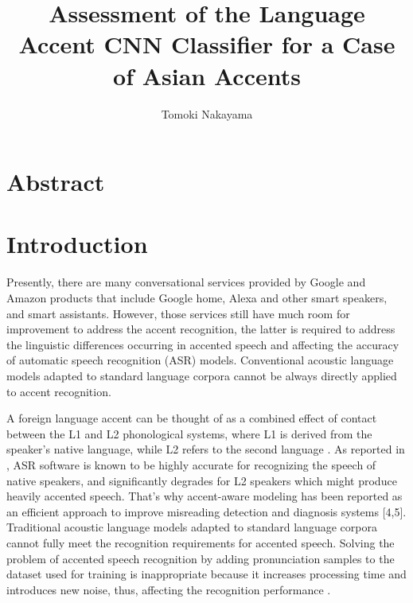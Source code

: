 \documentclass[ams]{U-AizuGT}
\author{Tomoki Nakayama}
\title{Assessment of the Language Accent CNN Classifier for a Case of Asian Accents}
\begin{document}
\maketitle

\section*{Abstract}

\section{Introduction}
Presently, there are many conversational services provided by Google and Amazon products that include Google home, Alexa and other smart speakers, and smart assistants. However, those services still have much room for improvement to address the accent recognition, the latter is required to address the linguistic differences occurring in accented speech and affecting the accuracy of automatic speech recognition (ASR) models.
Conventional acoustic language models adapted to standard language corpora cannot be always directly applied to accent recognition.

A foreign language accent can be thought of as a combined effect of contact between the L1 and L2 phonological systems, where L1 is derived from the speaker's native language, while L2 refers to the second language \cite{Veranika:lang,2}. As reported in \cite{Rogerson:com}, ASR software is known to be highly accurate for recognizing the speech of native speakers, and significantly degrades for L2 speakers which might produce heavily accented speech. That's why accent-aware modeling has been reported as an efficient approach to improve misreading detection and diagnosis systems [4,5]. Traditional acoustic language models adapted to standard language corpora cannot fully meet the recognition requirements for accented speech. Solving the problem of accented speech recognition by adding pronunciation samples to the dataset used for training is inappropriate because it increases processing time and introduces new noise, thus, affecting the recognition performance \cite{Deshpande:acc}. 
\end{document}
